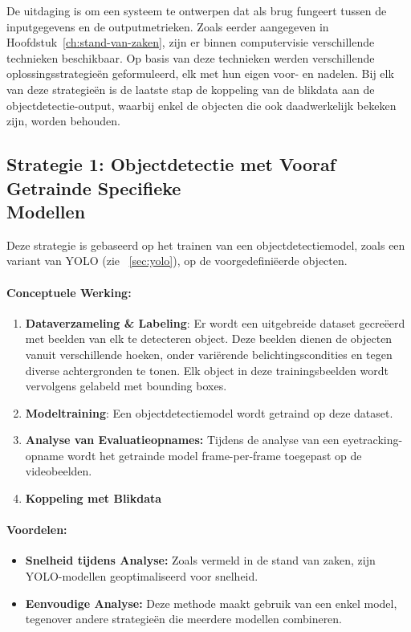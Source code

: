 De uitdaging is om een systeem te ontwerpen dat als brug fungeert tussen de inputgegevens en de outputmetrieken.
Zoals eerder aangegeven in Hoofdstuk~\ref{ch:stand-van-zaken}, zijn er binnen computervisie verschillende technieken beschikbaar.
Op basis van deze technieken werden verschillende oplossingsstrategieën geformuleerd, elk met hun eigen voor- en nadelen.
Bij elk van deze strategieën is de laatste stap de koppeling van de blikdata aan de objectdetectie-output, 
waarbij enkel de objecten die ook daadwerkelijk bekeken zijn, worden behouden.

\subsection{Strategie 1: Objectdetectie met Vooraf Getrainde Specifieke\\ Modellen}

Deze strategie is gebaseerd op het trainen van een objectdetectiemodel, zoals een variant van YOLO (zie ~\ref{sec:yolo}), 
op de voorgedefiniëerde objecten.

\paragraph{Conceptuele Werking:}
\begin{enumerate}
    \item \textbf{Dataverzameling \& Labeling}: Er wordt een uitgebreide dataset gecreëerd met beelden van elk te detecteren object. 
    Deze beelden dienen de objecten vanuit verschillende hoeken, onder variërende belichtingscondities en tegen diverse achtergronden te tonen. 
    Elk object in deze trainingsbeelden wordt vervolgens gelabeld met bounding boxes.
    \item \textbf{Modeltraining}: Een objectdetectiemodel wordt getraind op deze dataset.
    \item \textbf{Analyse van Evaluatieopnames:} Tijdens de analyse van een eyetracking-opname wordt het getrainde model frame-per-frame 
    toegepast op de videobeelden. 
    \item \textbf{Koppeling met Blikdata}
\end{enumerate}

\paragraph{Voordelen:}
\begin{itemize}
    \item \textbf{Snelheid tijdens Analyse:} Zoals vermeld in de stand van zaken, zijn YOLO-modellen geoptimaliseerd voor snelheid.
    \item \textbf{Eenvoudige Analyse:} Deze methode maakt gebruik van een enkel model, tegenover andere strategieën die meerdere modellen combineren. %
\end{itemize}

